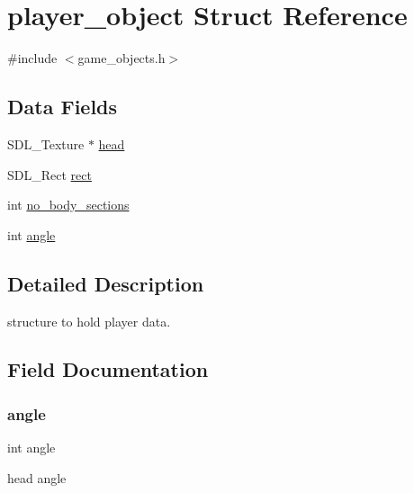 \hypertarget{structplayer__object}{}\section{player\+\_\+object Struct Reference}
\label{structplayer__object}


{\ttfamily \#include $<$game\+\_\+objects.\+h$>$}

\subsection*{Data Fields}
\begin{DoxyCompactItemize}
\item 
S\+D\+L\+\_\+\+Texture $\ast$ \mbox{\hyperlink{structplayer__object_a156af47b8be9c09879c063ad443877a5}{head}}
\item 
S\+D\+L\+\_\+\+Rect \mbox{\hyperlink{structplayer__object_a55aefd071649ac9dd8133e2d8a52d11f}{rect}}
\item 
int \mbox{\hyperlink{structplayer__object_a06948963e49fd8de64945937788fc3f8}{no\+\_\+body\+\_\+sections}}
\item 
int \mbox{\hyperlink{structplayer__object_a63177970cacb40efba67ce501ea89210}{angle}}
\end{DoxyCompactItemize}


\subsection{Detailed Description}
structure to hold player data. 

\subsection{Field Documentation}
\mbox{\label{structplayer__object_a63177970cacb40efba67ce501ea89210}} 
\subsubsection{\texorpdfstring{angle}{angle}}
{\footnotesize\ttfamily int angle}

head angle \mbox{\label{structplayer__object_a156af47b8be9c09879c063ad443877a5}} 
